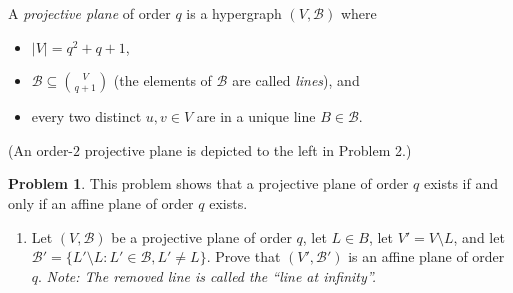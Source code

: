 \documentclass[11pt, letter]{amsart}
\theoremstyle{definition}
\newtheorem{problem}{Problem}[]
\newcommand{\cB}{\ensuremath{\mathcal B}}
\begin{document}
A \textit{projective plane} of order $q$ is a hypergraph $(V, \cB)$ where
\begin{itemize}
\item $|V| = q^2 + q + 1$,
\item $\cB \subseteq \binom{V}{q + 1}$ (the elements of $\cB$ are called \textit{lines}), and
\item every two distinct $u,v\in V$ are in a unique line $B \in \cB$.
\end{itemize}
(An order-$2$ projective plane is depicted to the left in Problem 2.)
\begin{problem} This problem shows that a projective plane of order $q$ exists if and only if an affine plane of order $q$ exists.
  \begin{enumerate}
  \item Let $(V, \cB)$ be a projective plane of order $q$, let $L \in B$, let $V' = V \setminus L$, and let $\cB' = \{L' \setminus L : L' \in \cB, L' \neq L\}$.  Prove that $(V', \cB')$ is an affine plane of order $q$.  \textit{Note: The removed line is called the ``line at infinity''.}

  

\end{enumerate}
\end{problem}
\end{document}

